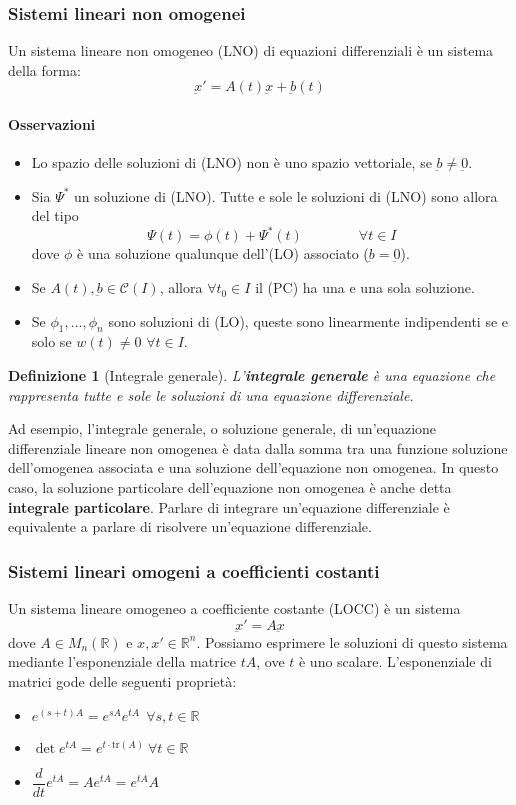 \documentclass[a4paper,12pt]{article}
\newcommand{\cont}{\mathscr{C}}
\newtheorem{defi}{Definizione}
\begin{document}
\subsubsection{Sistemi lineari non omogenei}
Un sistema lineare non omogeneo (LNO) di equazioni differenziali è un sistema della forma:
$$\underbar{x}' = A(t)\underbar{x} + \underbar{b}(t)$$
\paragraph{Osservazioni}
\begin{itemize}
 \item Lo spazio delle soluzioni di (LNO) non è uno spazio vettoriale, se $\underbar{b}\neq\underbar{0}$.
 \item Sia $\Psi^*$ un soluzione di (LNO). Tutte e sole le soluzioni di (LNO) sono allora del tipo
       $$ \Psi(t) = \phi(t) + \Psi^*(t)\qquad \qquad \forall t \in I$$
       dove $\phi$ è una soluzione qualunque dell'(LO) associato ($\underbar{b}=\underbar{0}$).
 \item Se $A(t) , \underbar{b}\in \cont(I)$, allora $ \forall t_0 \in I$ il (PC)  ha una e una sola soluzione.
 \item Se $\phi_1,...,\phi_n$ sono soluzioni di (LO), queste sono linearmente indipendenti se e solo se $w(t)\neq0$ $\forall t \in I$.
\end{itemize}

\begin{defi}[Integrale generale]
L'\textbf{integrale generale} è una equazione che rappresenta tutte e sole le soluzioni di una equazione differenziale.
\end{defi}
Ad esempio, l'integrale generale, o soluzione generale, di un'equazione differenziale lineare non omogenea è data dalla somma tra una funzione soluzione dell'omogenea associata e una soluzione dell'equazione non omogenea. In questo caso, la soluzione particolare dell'equazione non omogenea è anche detta \textbf{integrale particolare}. Parlare di integrare un'equazione differenziale è equivalente a parlare di risolvere un'equazione differenziale.

\subsubsection{Sistemi lineari omogeni a coefficienti costanti}
Un sistema lineare omogeneo a coefficiente costante (LOCC) è un sistema
$$\underbar{x}' = A\underbar{x}$$
dove $A \in M_n(\mathbb{R})$ e $x,x'\in\mathbb{R}^n$. Possiamo esprimere le soluzioni di questo sistema mediante l'esponenziale della matrice $tA$, ove $t$ è uno scalare.
L'esponenziale di matrici gode delle seguenti proprietà:
\begin{itemize}
\item $e^{(s+t)A} = e^{sA}e^{tA} \ \ \forall s,t \in \mathbb{R} $
\item $\det e^{tA}=e^{t\cdot\text{tr}(A)} \ \forall t \in \mathbb{R} $
\item $\dfrac{d}{dt} e^{tA} = A e^{tA} = e^{tA}A$
\end{itemize}
\end{document}
